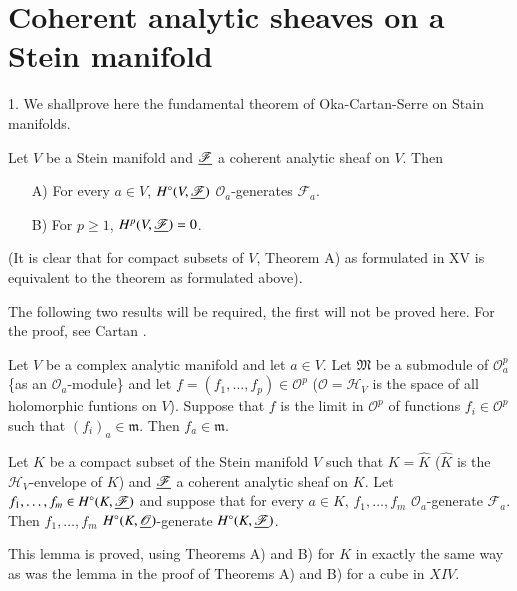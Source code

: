 \chapter{Coherent analytic sheaves on a Stein manifold}\label{chap16}

1. We shall\pageoriginale prove here the fundamental theorem of
Oka-Cartan-Serre on Stain manifolds.

\medskip
{} 
Let $V$ be a Stein manifold and $\underline{\mathscr{F}}$ a coherent analytic
sheaf on $V$. Then 
\begin{itemize}
\item[A)] For every $a \in V$, $H^\circ (V, \underline{\mathscr{F}})$
  $\mathscr{O}_a$-generates $\mathscr{F}_a$.

\item[B)] For $p \geq 1$, $H^p (V, \underline{\mathscr{F}})=0$. 
\end{itemize}

(It is clear that for compact subsets of $V$, Theorem A) as formulated
in XV is equivalent to the theorem as formulated above).

The following two results will be required, the first will not be
proved here. For the proof, see Cartan \cite{p3:key1}. 

\setcounter{thm}{0}
\begin{thm}\label{chap16:thm1}
Let $V$ be a complex analytic manifold and let $a \in V$. Let
$\mathfrak{M}$ be a submodule of $\mathscr{O}^p_a$ \{as an
$\mathscr{O}_a$-module\} and let $f = (f_1, \ldots, f_p) \in
\mathscr{O}^p$ ($\mathscr{O} = \mathscr{H}_V$ is the space of all
holomorphic funtions on $V$). Suppose that $f$ is the limit in
$\mathscr{O}^p$ of functions $f_i \in \mathscr{O}^p$ such that
$(f_i)_a \in \mathfrak{m}$. Then $f_a \in\mathfrak{m}$. 
\end{thm}

\begin{lemma*}
Let $K$ be a compact subset of the Stein manifold $V$ such that $K =
\hat{K}$ ($\hat{K}$ is the $\mathscr{H}_V$-envelope of $K$) and
$\underline{\mathscr{F}}$ a coherent analytic sheaf on $K$. Let $f_1, \ldots,
f_{m} \in H^\circ (K, \underline{\mathscr{F}})$ and suppose that for every $a
\in K$, $f_1, \ldots, f_m$ $\mathscr{O}_a$-generate
$\mathscr{F}_a$. Then $f_1, \ldots, f_m$ $H^\circ
(K,\underline{\mathscr{O}})$-generate $H^\circ(K,\break \u{\mathscr{F}})$. 
\end{lemma*}

This lemma is proved, using Theorems A) and B) for $K$ in exactly the
same way as was the lemma in the proof of Theorems A) and B) for a
cube in $XIV$. 


